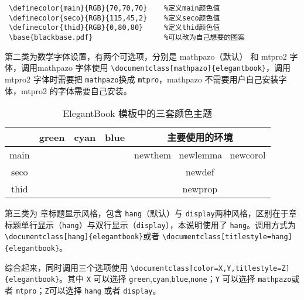 \documentclass[color=green,mathpazo,titlestyle=hang]{elegantbook}
\begin{document}
\begin{verbatim}
 \definecolor{main}{RGB}{70,70,70}    %定义main颜色值
 \definecolor{seco}{RGB}{115,45,2}    %定义seco颜色值
 \definecolor{thid}{RGB}{0,80,80}     %定义thid颜色值
 \base{blackbase.pdf}                 %可以改为自己想要的图案
\end{verbatim}

第二类为{\color{main}数学字体}设置，有两个可选项，分别是 mathpazo（默认） 和 mtpro2 字体，调用mathpazo 字体使用 \verb|\documentclass[mathpazo]{elegantbook}|，调用 mtpro2 字体时需要把 \verb|mathpazo|换成 \verb|mtpro|，mathpazo 不需要用户自己安装字体，mtpro2 的字体需要自己安装。

\begin{table}[htp]
\centering
\begin{tabular}{ccccc}
\toprule	
	  & green & cyan & blue & 主要使用的环境\\ 
\midrule
main & \makecell{{\color{main1}\rule{1cm}{1cm}}}& \makecell{{\color{main2}\rule{1cm}{1cm}}}&\makecell{ {\color{main3}\rule{1cm}{1cm}}}& newthem \ newlemma \ newcorol\\

seco &\makecell{ {\color{seco1}\rule{1cm}{1cm}}}& \makecell{{\color{seco2}\rule{1cm}{1cm}}}&\makecell{ {\color{seco3}\rule{1cm}{1cm}}}&newdef\\

thid &\makecell{ {\color{thid1}\rule{1cm}{1cm}}}& \makecell{{\color{thid2}\rule{1cm}{1cm}}}&\makecell{ {\color{thid3}\rule{1cm}{1cm}}}&newprop\\
\bottomrule
\end{tabular}
\caption{ElegantBook 模板中的三套颜色主题\label{tab:color thm}}
\end{table}

第三类为{\color{main} 章标题显示风格}，包含 \verb|hang|（默认）与 \verb|display|两种风格，区别在于章标题单行显示（\verb|hang|）与双行显示（\verb|display|），本说明使用了 \verb|hang|。调用方式为 \verb|\documentclass[hang]{elegantbook}|或者 \verb|\documentclass[titlestyle=hang]{elegantbook}|。

综合起来，同时调用三个选项使用 \verb|\documentclass[color=X,Y,titlestyle=Z]{elegantbook}|。其中 \verb|X| 可以选择 \verb|green|,\verb|cyan|,\verb|blue|,\verb|none|；\verb|Y| 可以选择 \verb|mathpazo|或者 \verb|mtpro|；\verb|Z|可以选择 \verb|hang| 或者 \verb|display|。
\end{document}
